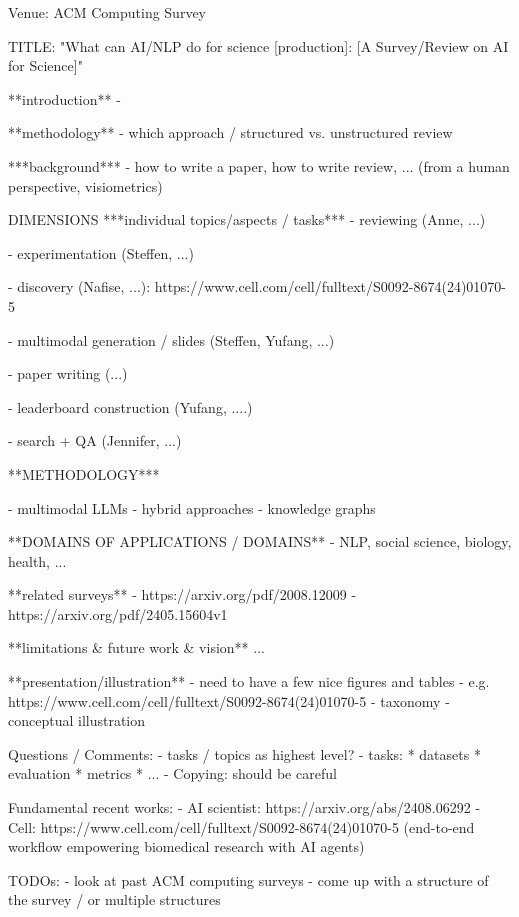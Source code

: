 Venue: ACM Computing Survey

TITLE: "What can AI/NLP do for science [production]: [A Survey/Review on AI for Science]"

**introduction**
- 

**methodology**
- which approach / structured vs. unstructured review


***background***
- how to write a paper, how to write review, ... (from a human perspective, visiometrics)

DIMENSIONS
  ***individual topics/aspects / tasks***
- reviewing (Anne, ...)

- experimentation (Steffen, ...)

- discovery (Nafise, ...): https://www.cell.com/cell/fulltext/S0092-8674(24)01070-5

- multimodal generation / slides (Steffen, Yufang, ...)

- paper writing (...)

- leaderboard construction (Yufang, ....)

- search + QA (Jennifer, ...)

  **METHODOLOGY***

- multimodal LLMs
- hybrid approaches
- knowledge graphs

  **DOMAINS OF APPLICATIONS / DOMAINS**
- NLP, social science, biology, health, ...


**related surveys**
- https://arxiv.org/pdf/2008.12009
- https://arxiv.org/pdf/2405.15604v1

**limitations \& future work \& vision**
...

**presentation/illustration**
- need to have a few nice figures and tables 
- e.g. https://www.cell.com/cell/fulltext/S0092-8674(24)01070-5
- taxonomy
- conceptual illustration


Questions / Comments:
- tasks / topics as highest level?
- tasks:
   * datasets
   * evaluation
   * metrics
   * ...
- Copying: should be careful 

Fundamental recent works:
- AI scientist: https://arxiv.org/abs/2408.06292
- Cell: https://www.cell.com/cell/fulltext/S0092-8674(24)01070-5 (end-to-end workflow empowering biomedical research with AI agents)


TODOs:
- look at past ACM computing surveys
- come up with a structure of the survey / or multiple structures 



